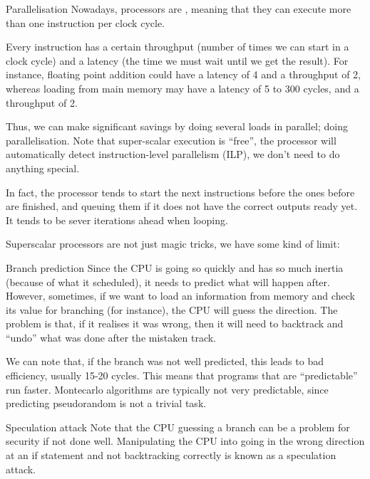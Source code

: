 \documentclass[a4paper]{article}
\begin{document}
\begin{parag}{Parallelisation}
    Nowadays, processors are , meaning that they can execute more than one instruction per clock cycle.

    Every instruction has a certain throughput (number of times we can start in a clock cycle) and a latency (the time we must wait until we get the result). For instance, floating point addition could have a latency of 4 and a throughput of 2, whereas loading from main memory may have a latency of 5 to 300 cycles, and a throughput of 2.

    Thus, we can make significant savings by doing several loads in parallel; doing parallelisation. Note that super-scalar execution is ``free'', the processor will automatically detect instruction-level parallelism (ILP), we don't need to do anything special.

    In fact, the processor tends to start the next instructions before the ones before are finished, and queuing them if it does not have the correct outputs ready yet. It tends to be sever iterations ahead when looping.

    Superscalar processors are not just magic tricks, we have some kind of limit:
\end{parag}

\begin{parag}{Branch prediction}
    Since the CPU is going so quickly and has so much inertia (because of what it scheduled), it needs to predict what will happen after. However, sometimes, if we want to load an information from memory and check its value for branching (for instance), the CPU will guess the direction. The problem is that, if it realises it was wrong, then it will need to backtrack and ``undo'' what was done after the mistaken track.

    We can note that, if the branch was not well predicted, this leads to bad efficiency, usually 15-20 cycles. This means that programs that are ``predictable'' run faster. Montecarlo algorithms are typically not very predictable, since predicting pseudorandom is not a trivial task.

    \begin{subparag}{Speculation attack}
        Note that the CPU guessing a branch can be a problem for security if not done well. Manipulating the CPU into going in the wrong direction at an if statement and not backtracking correctly is known as a speculation attack.
    \end{subparag}
\end{parag}
\end{document}
